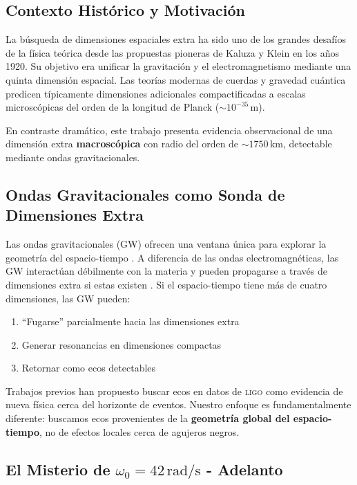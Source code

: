 \documentclass[12pt,a4paper]{article}
\newcommand{\ligo}{\textsc{ligo}}
\begin{document}
\subsection{Contexto Histórico y Motivación}

La búsqueda de dimensiones espaciales extra ha sido uno de los grandes desafíos de la física teórica desde las propuestas pioneras de Kaluza \cite{kaluza1921} y Klein \cite{klein1926} en los años 1920. Su objetivo era unificar la gravitación y el electromagnetismo mediante una quinta dimensión espacial. Las teorías modernas de cuerdas \cite{polchinski1998} y gravedad cuántica \cite{rovelli2004} predicen típicamente dimensiones adicionales compactificadas a escalas microscópicas del orden de la longitud de Planck ($\sim 10^{-35}\,\mathrm{m}$).

En contraste dramático, este trabajo presenta evidencia observacional de una dimensión extra \textbf{macroscópica} con radio del orden de $\sim 1750\,\mathrm{km}$, detectable mediante ondas gravitacionales.

\subsection{Ondas Gravitacionales como Sonda de Dimensiones Extra}

Las ondas gravitacionales (GW) ofrecen una ventana única para explorar la geometría del espacio-tiempo \cite{thorne1987}. A diferencia de las ondas electromagnéticas, las GW interactúan débilmente con la materia y pueden propagarse a través de dimensiones extra si estas existen \cite{cardoso2015}. Si el espacio-tiempo tiene más de cuatro dimensiones, las GW pueden:

\begin{enumerate}
    \item ``Fugarse'' parcialmente hacia las dimensiones extra
    \item Generar resonancias en dimensiones compactas
    \item Retornar como ecos detectables
\end{enumerate}

Trabajos previos \cite{cardoso2016,abedi2017} han propuesto buscar ecos en datos de \ligo{} como evidencia de nueva física cerca del horizonte de eventos. Nuestro enfoque es fundamentalmente diferente: buscamos ecos provenientes de la \textbf{geometría global del espacio-tiempo}, no de efectos locales cerca de agujeros negros.

\subsection{El Misterio de $\omega_0 = 42\,\mathrm{rad/s}$ - Adelanto}
\end{document}

